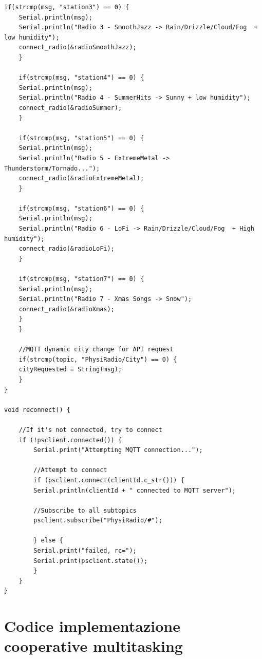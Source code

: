 \documentclass[12pt,a4paper]{report}
\begin{document}
\begin{lstlisting}[style=customC++Arduino, label={Codice 1.1}, caption={Codice 1.1}, title={Codice 1.1: libreria PubSubClient}, basicstyle=\linespread{0.7}\footnotesize\ttfamily]
	if(strcmp(msg, "station3") == 0) {
	Serial.println(msg);
	Serial.println("Radio 3 - SmoothJazz -> Rain/Drizzle/Cloud/Fog  + low humidity");
	connect_radio(&radioSmoothJazz);
	}
	
	if(strcmp(msg, "station4") == 0) {
	Serial.println(msg);
	Serial.println("Radio 4 - SummerHits -> Sunny + low humidity");
	connect_radio(&radioSummer);
	}
	
	if(strcmp(msg, "station5") == 0) {
	Serial.println(msg);
	Serial.println("Radio 5 - ExtremeMetal -> Thunderstorm/Tornado...");
	connect_radio(&radioExtremeMetal);
	}
	
	if(strcmp(msg, "station6") == 0) {
	Serial.println(msg);
	Serial.println("Radio 6 - LoFi -> Rain/Drizzle/Cloud/Fog  + High humidity");
	connect_radio(&radioLoFi);
	}
	
	if(strcmp(msg, "station7") == 0) {
	Serial.println(msg);
	Serial.println("Radio 7 - Xmas Songs -> Snow");
	connect_radio(&radioXmas);
	}
	}
	
	//MQTT dynamic city change for API request
	if(strcmp(topic, "PhysiRadio/City") == 0) {
	cityRequested = String(msg);
	}
}

void reconnect() {

	//If it's not connected, try to connect
	if (!psclient.connected()) {
		Serial.print("Attempting MQTT connection...");
		
		//Attempt to connect
		if (psclient.connect(clientId.c_str())) {
		Serial.println(clientId + " connected to MQTT server");
		
		//Subscribe to all subtopics
		psclient.subscribe("PhysiRadio/#");
		
		} else {
		Serial.print("failed, rc=");
		Serial.print(psclient.state());
		}
	}
}

\end{lstlisting}

\chapter{Codice implementazione cooperative multitasking} \label{app:task}
\end{document}
